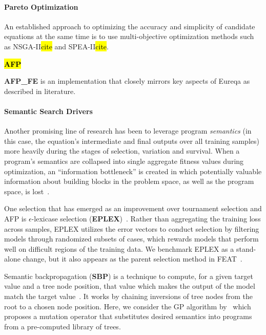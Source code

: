 \paragraph{Pareto Optimization}

An established approach to optimizing the accuracy and simplicity of candidate equations at the same time is to use multi-objective optimization methods such as NSGA-II\hl{cite} and SPEA-II\hl{cite}. 

\hl{\textbf{AFP}}

\textbf{AFP\_FE} is an implementation that closely mirrors key aspects of Eureqa as described in literature. 

\paragraph{Semantic Search Drivers}

Another promising line of research has been to leverage program \textit{semantics} (in this case, the equation's intermediate and final outputs over all training samples) more heavily during the stages of selection, variation and survival. 
When a program's semantics are collapsed into single aggregate fitness values during optimization, an ``information bottleneck'' is created in which potentially valuable information about building blocks in the problem space, as well as the program space, is lost~\cite{azadKrzysztofKrawiecBehavioral2017}. 

One selection that has emerged as an improvement over tournament selection and AFP is $\epsilon$-lexicase selection (\textbf{EPLEX})~\cite{lacavaEpsilonLexicaseSelectionRegression2016c}. 
Rather than aggregating the training loss across samples, EPLEX utilizes the error vectors to conduct selection by filtering models through randomized subsets of cases, which rewards models that perform well on difficult regions of the training data. 
We benchmark EPLEX as a stand-alone change, but it also appears as the parent selection method in FEAT~\cite{lacavaLearningConciseRepresentations2019c}. 


Semantic backpropagation (\textbf{SBP}) is a technique to compute, for a given target value and a tree node position, that value which makes the output of the model match the target value~\cite{wieloch2013running,krawiec2013approximating,pawlak2014semantic}. 
It works by chaining inversions of tree nodes from the root to a chosen node position. 
Here, we consider the GP algorithm by~\citet{virgolinLinearScalingSemantic2019} which proposes a mutation operator that substitutes desired semantics into programs from a pre-computed library of trees. 


